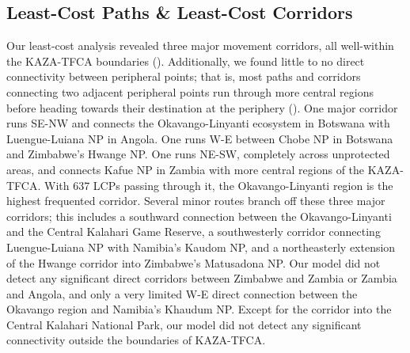 \documentclass[abstract=on,10pt,a4paper,bibliography=totocnumbered]{article}
\begin{document}
\subsection{Least-Cost Paths \& Least-Cost Corridors}
Our least-cost analysis revealed three major movement corridors, all well-within
the KAZA-TFCA boundaries (). Additionally, we found little to no
direct connectivity between peripheral points; that is, most paths and corridors
connecting two adjacent peripheral points run through more central regions
before heading towards their destination at the periphery ().
One major corridor runs SE-NW and connects the Okavango-Linyanti ecosystem in
Botswana with Luengue-Luiana NP in Angola. One runs W-E between Chobe NP in
Botswana and Zimbabwe's Hwange NP. One runs NE-SW, completely across unprotected
areas, and connects Kafue NP in Zambia with more central regions of the
KAZA-TFCA. With 637 LCPs passing through it, the Okavango-Linyanti region is the
highest frequented corridor. Several minor routes branch off these three major
corridors; this includes a southward connection between the Okavango-Linyanti
and the Central Kalahari Game Reserve, a southwesterly corridor connecting
Luengue-Luiana NP with Namibia's Kaudom NP, and a northeasterly extension of the
Hwange corridor into Zimbabwe's Matusadona NP. Our model did not detect any
significant direct corridors between Zimbabwe and Zambia or Zambia and Angola,
and only a very limited W-E direct connection between the Okavango region and
Namibia's Khaudum NP. Except for the corridor into the Central Kalahari
National Park, our model did not detect any significant connectivity outside the
boundaries of KAZA-TFCA.
\end{document}
